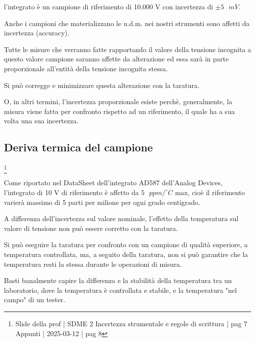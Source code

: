 l'integrato è un campione di riferimento di 10.000 V con incertezza di $\pm 5 \text{ } mV$. \newline 

Anche i campioni che materializzano le u.d.m. nei nostri strumenti sono affetti da incertezza (accuracy). \newline 

Tutte le misure che verranno fatte rapportando il valore della tensione incognita a questo valore campione saranno affette da alterazione ed essa sarà in parte proporzionale 
all'entità della tensione incognita stessa. \newline 

Si può corregge e minimizzare questa alterazione con la taratura. \newline 

O, in altri termini, l'incertezza proporzionale esiste perchè, generalmente, 
la misura viene fatta per confronto rispetto ad un riferimento, il quale ha a sua volta una sua incertezza. \newline 

\newpage 

\subsection{Deriva termica del campione}
\footnote{Slide della prof | SDME 2 Incertezza strumentale e regole di scrittura | pag 7 \\  
Appunti | 2025-03-12 | pag 8}

Come riportato nel DataSheet dell'integrato AD587 dell'Analog Devices, l'integrato di 10 V di riferimento è affetto da $5 \text{ } ppm/^{\circ} C $ max,
cioè il riferimento varierà massimo di 5 parti per milione per ogni grado centigrado. \newline 

A differenza dell'incertezza sul valore nominale, l'effetto della temperatura sul valore di tensione non può essere corretto con la taratura. \newline 

Si può eseguire la taratura per confronto con un campione di qualità superiore, a temperatura controllata, 
ma, a seguito della taratura, non si può garantire che la temperatura resti la stessa durante le operazioni di misura. \newline 

Basti banalmente capire la differenza e la stabilità della temperatura tra un laboratorio, dove la temperatura è controllata e stabile, 
e la temperatura "nel campo" di un tester. \newline 

